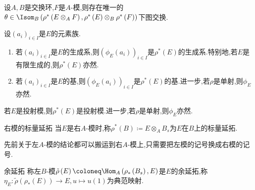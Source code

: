 \begin{proposition}{}{}
	设$A,B$是交换环,$F$是$A$-模,则存在唯一的$\theta\in\Isom_{B}\left(\rho^{\ast}\left(E\otimes_{A}F\right),\rho^{\ast}\left(E\right)\otimes_{B}\rho^{\ast}\left(F\right)\right)$下图交换.
	\begin{center}
	\end{center}
\end{proposition}

\begin{proposition}{}{}
	设$\left(a_{i}\right)_{i\in I}$是$E$的元素族.
	\begin{enumerate}
		\item 若$\left(a_{i}\right)_{i\in I}$是$E$的生成系,则$\left(\phi_{E}\left(a_{i}\right)\right)_{i\in I}$是$\rho^{\ast}\left(E\right)$的生成系.特别地,若$E$是有限生成的,则$\rho^{\ast}\left(E\right)$亦然.
		\item 若$\left(a_{i}\right)_{i\in I}$是$E$的基,则$\left(\phi_{E}\left(a_{i}\right)\right)_{i\in I}$是$\rho^{\ast}\left(E\right)$的基.进一步,若$\rho$是单射,则$\phi_{E}$亦然.
	\end{enumerate}
\end{proposition}

\begin{corollary}{}{}
	若$E$是投射模,则$\rho^{\ast}\left(E\right)$是投射模.进一步,若$\rho$是单射,则$\phi_{E}$亦然.
\end{corollary}

\begin{remark}{右模的标量延拓}{}
	当$E$是右$A$-模时,称$\rho^{\ast}\left(B\right)\coloneq E\otimes_{A}B_{s}$为$E$在$B$上的标量延拓.
	
	先前关于左$A$-模的结论都可以搬运到右$A$-模上,只需要把左模的记号换成右模的记号.
\end{remark}

\begin{definition}{余延拓}{}
	称左$B$-模$\tilde{\rho}\left(E\right)\coloneq\Hom_{A}\left(\rho_{\ast}\left(B_{s}\right),E\right)$是$E$的余延拓,称$\eta_{E}:\tilde{\rho}\left(\rho_{\ast}\left(E\right)\right)\to E,u\mapsto u\left(1\right)$为典范映射.
\end{definition}


